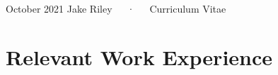\documentclass[11pt, a4paper]{awesome-cv}
\begin{document}
\makecvheader

\makecvfooter
  {October 2021}
    {Jake Riley~~~·~~~Curriculum Vitae}
  {\thepage}





\hypertarget{relevant-work-experience}{%
\section{\texorpdfstring{ Relevant Work
Experience}{ Relevant Work Experience}}\label{relevant-work-experience}}
\end{document}
